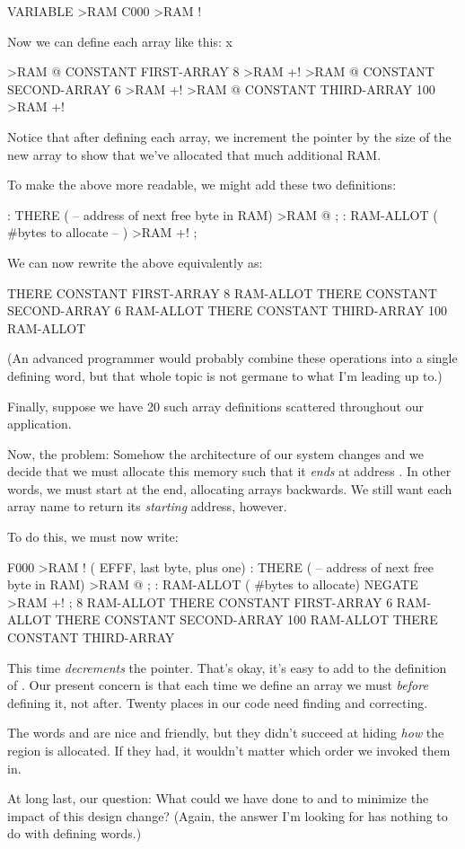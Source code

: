 \begin{enumerate}
\begin{Code}
VARIABLE >RAM
C000 >RAM !
\end{Code}
Now we can define each array like this:
x\begin{Code}
>RAM @ CONSTANT FIRST-ARRAY    8 >RAM +!
>RAM @ CONSTANT SECOND-ARRAY   6 >RAM +!
>RAM @ CONSTANT THIRD-ARRAY  100 >RAM +!
\end{Code}
Notice that after defining each array, we increment the pointer by the
size of the new array to show that we've allocated that much additional
RAM.

\goodbreak
To make the above more readable, we might add these two
definitions:

\begin{Code}
: THERE ( -- address of next free byte in RAM)
     >RAM @ ;
: RAM-ALLOT ( #bytes to allocate -- )  >RAM +! ;
\end{Code}
We can now rewrite the above equivalently as:

\begin{Code}
THERE CONSTANT FIRST-ARRAY    8 RAM-ALLOT
THERE CONSTANT SECOND-ARRAY   6 RAM-ALLOT
THERE CONSTANT THIRD-ARRAY  100 RAM-ALLOT
\end{Code}
(An advanced \Forth{} programmer would probably combine these operations
into a single defining word, but that whole topic is not germane to
what I'm leading up to.)

Finally, suppose we have 20 such array definitions scattered
throughout our application.

Now, the problem: Somehow the architecture of our system changes and
we decide that we must allocate this memory such that it \emph{ends}
at  address . In other words, we must start at the end,
allocating arrays backwards. We still want each array name to return
its \emph{starting} address, however.

To do this, we must now write:

\begin{Code}
F000 >RAM ! ( EFFF, last byte, plus one)
: THERE ( -- address of next free byte in RAM)
     >RAM @ ;
: RAM-ALLOT  ( #bytes to allocate)  NEGATE >RAM +! ;
  8 RAM-ALLOT  THERE CONSTANT FIRST-ARRAY
  6 RAM-ALLOT  THERE CONSTANT SECOND-ARRAY
100 RAM-ALLOT  THERE CONSTANT THIRD-ARRAY
\end{Code}
This time  \emph{decrements} the pointer. That's
okay, it's easy to add  to the definition of
. Our present concern is that each time we define an
array we must  \emph{before} defining it, not after. Twenty
places in our code need finding and correcting.

The words  and  are nice and friendly,
but they didn't succeed at hiding \emph{how} the region is
allocated. If they had, it wouldn't matter which order we invoked them
in.

At long last, our question: What could we have done to  and
 to minimize the impact of this design change? (Again, the
answer I'm looking for has nothing to do with defining words.)
\end{enumerate}
